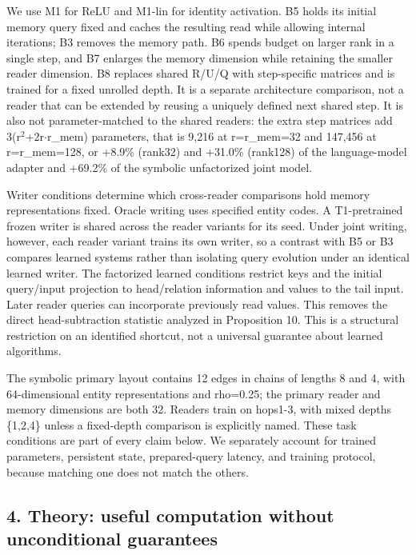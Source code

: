 We use M1 for ReLU and M1-lin for identity activation. B5 holds its initial memory query
fixed and caches the resulting read while allowing internal iterations; B3 removes the
memory path. B6 spends budget on larger rank in a single step, and B7 enlarges the
memory dimension while retaining the smaller reader dimension. B8 replaces shared
R/\allowbreak{}U/\allowbreak{}Q with step-specific matrices and is trained for a fixed unrolled depth. It is a
separate architecture comparison, not a reader that can be extended by reusing a
uniquely defined next shared step. It is also not parameter-matched to the shared
readers: the extra step matrices add 3(r\ensuremath{^2}+2r\ensuremath{\cdot}r\_mem) parameters, that is 9,216 at
r=r\_mem=32 and 147,456 at r=r\_mem=128, or +8.9\% (rank32) and +31.0\% (rank128) of the
language-model adapter and +69.2\% of the symbolic unfactorized joint model.  %

Writer conditions determine which cross-reader comparisons hold memory representations
fixed. Oracle writing uses specified entity codes. A T1-pretrained frozen writer is  %
shared across the reader variants for its seed. Under joint writing, however, each  %
reader variant trains its own writer, so a contrast with B5 or B3 compares learned
systems rather than isolating query evolution under an identical learned writer.
 The factorized learned conditions restrict  %
keys and the initial query/\allowbreak{}input projection to head/\allowbreak{}relation information and values
to the tail input. Later reader queries can incorporate previously read values.  %
This removes
the direct head-subtraction statistic analyzed in Proposition 10. This is a structural
restriction on an identified shortcut, not a universal guarantee about learned algorithms.

The symbolic primary layout contains 12 edges in chains of lengths 8 and 4, with
64-dimensional entity representations and rho=0.25; the primary reader and memory
dimensions are both 32. Readers train on hops1-3, with  %
mixed depths \{1,2,4\} unless a fixed-depth comparison is explicitly named.  %
These task conditions are part of every claim below. We separately account for trained
parameters, persistent state, prepared-query latency, and training protocol, because
matching one does not match the others.


\subsection*{4. Theory: useful computation without unconditional guarantees}

